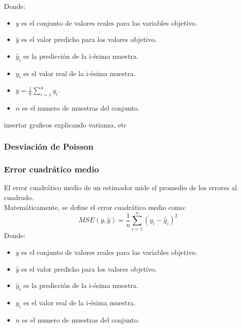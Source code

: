 Donde:
\begin{itemize}
	\item $y$ es el conjunto de valores reales para las variables objetivo.
	\item $\hat{y}$ es el valor predicho para los valores objetivo.
	\item $\hat{y}_i$ es la predicción de la  i-ésima muestra.
	\item $y_i$ es el valor real de la i-ésima muestra.
	\item $\overline{y} = \frac{1}{n} \sum_{i=1}^{n} y_i$.
	\item $n$ es el numero de muestras del conjunto.
\end{itemize}
insertar graficos explicando varianza,  etc
\subsubsection{Desviación de Poisson}
\subsubsection{Error cuadrático medio}
El error cuadrático medio de un estimador mide el promedio de los errores al cuadrado.  \\
Matemáticamente, se define el error cuadrático medio como:
\[
	MSE(y,\hat{y}) = \frac{1}{n} \sum_{i=1}^{n} (y_i - \hat{y}_i) ^2
\]
Donde:
\begin{itemize}
	\item $y$ es el conjunto de valores reales para las variables objetivo.
	\item $\hat{y}$ es el valor predicho para los valores objetivo.
	\item $\hat{y}_i$ es la predicción de la  i-ésima muestra.
	\item $y_i$ es el valor real de la i-ésima muestra.
	\item $n$ es el numero de muestras del conjunto.
\end{itemize}
